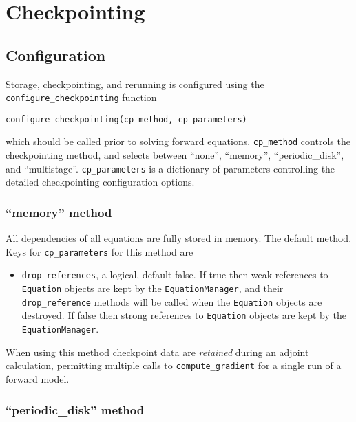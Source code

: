 \documentclass[11pt]{article}
\begin{document}
\section{Checkpointing}\label{sect:checkpointing}

\subsection{Configuration}\label{sect:configure_checkpointing}

Storage, checkpointing, and rerunning is configured using the
\texttt{configure\_checkpointing} function
\begin{lstlisting}
configure_checkpointing(cp_method, cp_parameters)
\end{lstlisting}
which should be called prior to solving forward equations. \texttt{cp\_method}
controls the checkpointing method, and selects between ``none'', ``memory'',
``periodic\_disk'', and ``multistage''. \texttt{cp\_parameters} is a dictionary
of parameters controlling the detailed checkpointing configuration options.

\subsubsection{``memory'' method}\label{sect:configure_checkpointing_memory}

All dependencies of all equations are fully stored in memory. The default
method. Keys for \texttt{cp\_parameters} for this method are
\begin{itemize}
  \item \texttt{drop\_references}, a logical, default false. If true then weak
    references to \texttt{Equation} objects are kept by the
    \texttt{EquationManager}, and their \texttt{drop\_reference} methods will
    be called when the \texttt{Equation} objects are destroyed. If false then
    strong references to \texttt{Equation} objects are kept by the
    \texttt{EquationManager}.
\end{itemize}

When using this method checkpoint data are \emph{retained} during an adjoint
calculation, permitting multiple calls to \texttt{compute\_gradient} for a
single run of a forward model.

\subsubsection{``periodic\_disk'' method}
\end{document}
